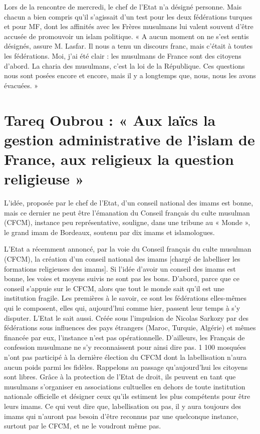 Lors de la rencontre de mercredi, le chef de l’Etat n’a désigné personne. Mais chacun a bien compris qu’il s’agissait d’un test pour les deux fédérations turques et pour MF, dont les affinités avec les Frères musulmans lui valent souvent d’être accusée de promouvoir un islam politique. « A aucun moment on ne s’est sentis désignés, assure M. Lasfar. Il nous a tenu un discours franc, mais c’était à toutes les fédérations. Moi, j’ai été clair : les musulmans de France sont des citoyens d’abord. La charia des musulmans, c’est la loi de la République. Ces questions nous sont posées encore et encore, mais il y a longtemps que, nous, nous les avons évacuées. »


\section*{Tareq Oubrou : « Aux laïcs la gestion administrative de l’islam de France, aux religieux la question religieuse »}



L’idée, proposée par le chef de l’Etat, d’un conseil national des imams est bonne, mais ce dernier ne peut être l’émanation du Conseil français du culte musulman (CFCM), instance peu représentative, souligne, dans une tribune au « Monde », le grand imam de Bordeaux, soutenu par dix imams et islamologues.

 L’Etat a récemment annoncé, par la voie du Conseil français du culte musulman (CFCM), la création d’un conseil national des imams [chargé de labelliser les formations religieuses des imams]. Si l’idée d’avoir un conseil des imams est bonne, les voies et moyens suivis ne sont pas les bons. D’abord, parce que ce conseil s’appuie sur le CFCM, alors que tout le monde sait qu’il est une institution fragile. Les premières à le savoir, ce sont les fédérations elles-mêmes qui le composent, elles qui, aujourd’hui comme hier, passent leur temps à s’y disputer. L’Etat le sait aussi.
Créée sous l’impulsion de Nicolas Sarkozy par des fédérations sous influences des pays étrangers (Maroc, Turquie, Algérie) et mêmes financée par eux, l’instance n’est pas opérationnelle. D’ailleurs, les Français de confession musulmane ne s’y reconnaissent pour ainsi dire pas. 1 100 mosquées n’ont pas participé à la dernière élection du CFCM dont la labellisation n’aura aucun poids parmi les fidèles. Rappelons au passage qu’aujourd’hui les citoyens sont libres. Grâce à la protection de l’Etat de droit, ils peuvent en tant que musulmans s’organiser en associations cultuelles en dehors de toute institution nationale officielle et désigner ceux qu’ils estiment les plus compétents pour être leurs imams. Ce qui veut dire que, labellisation ou pas, il y aura toujours des imams qui n’auront pas besoin d’être reconnus par une quelconque instance, surtout par le CFCM, et ne le voudront même pas.
